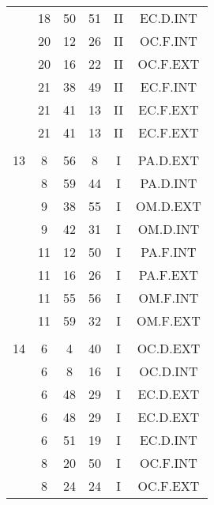 \documentclass[12pt, a4paper]{article}
\begin{document}
\begin{multicols}{3}
{\begin{tabular}{c c c c c c}
	 	 	 	 & 18 & 50 & 51 & II & EC.D.INT\\%
	 	 	 	 & 20 & 12 & 26 & II & OC.F.INT\\%
	 	 	 	 & 20 & 16 & 22 & II & OC.F.EXT\\%
	 	 	 	 & 21 & 38 & 49 & II & EC.F.INT\\%
	 	 	 	 & 21 & 41 & 13 & II & EC.F.EXT\\%
	 	 	 	 & 21 & 41 & 13 & II & EC.F.EXT\\%
	 	 	 	 & & & & & \\%
	 	 	 	13 & 8 & 56 & 8 & I & PA.D.EXT\\%
	 	 	 	 & 8 & 59 & 44 & I & PA.D.INT\\%
	 	 	 	 & 9 & 38 & 55 & I & OM.D.EXT\\%
	 	 	 	 & 9 & 42 & 31 & I & OM.D.INT\\%
	 	 	 	 & 11 & 12 & 50 & I & PA.F.INT\\%
	 	 	 	 & 11 & 16 & 26 & I & PA.F.EXT\\%
	 	 	 	 & 11 & 55 & 56 & I & OM.F.INT\\%
	 	 	 	 & 11 & 59 & 32 & I & OM.F.EXT\\%
	 	 	 	 & & & & & \\%
	 	 	 	14 & 6 & 4 & 40 & I & OC.D.EXT\\%
	 	 	 	 & 6 & 8 & 16 & I & OC.D.INT\\%
	 	 	 	 & 6 & 48 & 29 & I & EC.D.EXT\\%
	 	 	 	 & 6 & 48 & 29 & I & EC.D.EXT\\%
	 	 	 	 & 6 & 51 & 19 & I & EC.D.INT\\%
	 	 	 	 & 8 & 20 & 50 & I & OC.F.INT\\%
	 	 	 	 & 8 & 24 & 24 & I & OC.F.EXT\\%

\end{tabular}}
\end{multicols}
\end{document}
